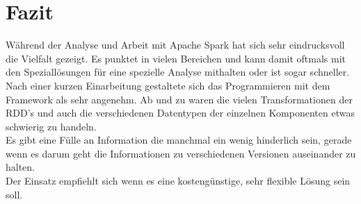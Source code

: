 \newpage
\chapter{Fazit} 

Während der Analyse und Arbeit mit Apache Spark hat sich sehr eindrucksvoll die Vielfalt gezeigt. Es punktet in vielen Bereichen und kann damit oftmals mit den Speziallösungen für eine spezielle Analyse mithalten oder ist sogar schneller.\\

\noindent
Nach einer kurzen Einarbeitung gestaltete sich das Programmieren mit dem Framework als sehr angenehm. Ab und zu waren die vielen Transformationen der RDD's und auch die verschiedenen Datentypen der einzelnen Komponenten etwas schwierig zu handeln. \\

\noindent
Es gibt eine Fülle an Information die manchmal ein wenig hinderlich sein, gerade wenn es darum geht die Informationen zu verschiedenen Versionen auseinander zu halten.\\

\noindent
Der Einsatz empfiehlt sich wenn es eine kostengünstige, sehr flexible Lösung sein soll. 